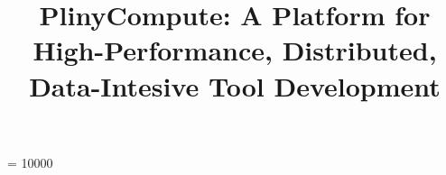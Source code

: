 \documentclass[11pt]{article}
\begin{document}
\widowpenalty = 10000

\title{PlinyCompute: A Platform for High-Performance, Distributed, Data-Intesive Tool Development}

\maketitle















%













\end{document}
